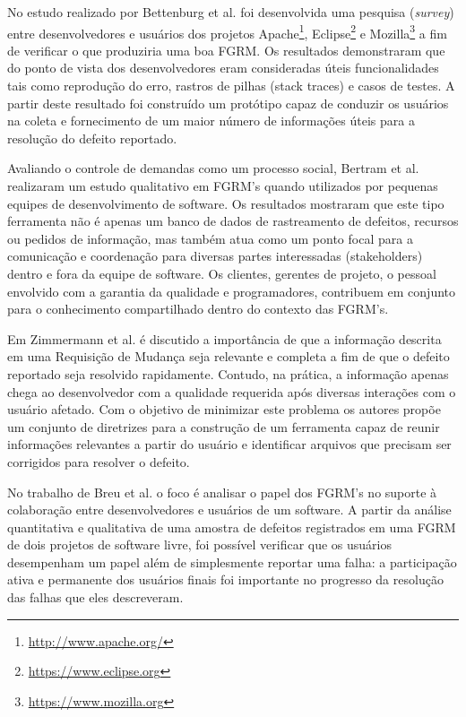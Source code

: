 \documentclass[msc,proposal,hidelot,hideabstract]{ppgccufmg} %
\begin{document}
No estudo realizado por Bettenburg et al. \cite{bettenburg2008makes} foi
desenvolvida uma pesquisa (\textit{survey}) entre desenvolvedores e usuários dos
projetos Apache\footnote{\url{http://www.apache.org/}}, Eclipse\footnote{\url{https://www.eclipse.org}} e Mozilla\footnote{\url{https://www.mozilla.org}} a fim de verificar o que
produziria uma boa FGRM. Os resultados demonstraram que do ponto de vista dos desenvolvedores eram consideradas úteis funcionalidades tais como reprodução do erro, rastros de pilhas (stack traces) e casos de testes. A partir deste resultado foi construído um protótipo capaz de conduzir os usuários na coleta e fornecimento de um maior número de informações úteis para a resolução do defeito reportado.

Avaliando o controle de demandas como um processo social, Bertram et
al. \cite{Bertram:2010:CCB:1718918.1718972} realizaram um estudo qualitativo em
FGRM's quando utilizados por pequenas equipes de desenvolvimento de software. Os resultados mostraram que este tipo ferramenta não é apenas um banco de dados de rastreamento de defeitos, recursos ou pedidos de informação, mas também atua como um ponto focal para a comunicação e coordenação para diversas partes interessadas (stakeholders) dentro e fora da equipe de software. Os
clientes, gerentes de projeto, o pessoal envolvido com a garantia da qualidade
e programadores, contribuem em conjunto para o conhecimento compartilhado dentro do contexto das FGRM's.

Em Zimmermann et al. \cite{5070993} é discutido a importância de que a informação descrita em uma Requisição de Mudança seja relevante e completa a fim de que o defeito reportado seja resolvido rapidamente. Contudo, na prática, a informação apenas chega ao desenvolvedor com a qualidade requerida após diversas interações com o usuário afetado. Com o objetivo de minimizar este
problema os autores propõe um conjunto de diretrizes para a construção de um ferramenta capaz de reunir informações relevantes a partir do usuário e identificar arquivos que precisam ser corrigidos para resolver o defeito.

No trabalho de Breu et al.\cite{Breu:2010:INB:1718918.1718973} o foco é analisar o papel dos FGRM's no suporte à colaboração entre desenvolvedores e usuários de um software. A partir da análise quantitativa e qualitativa de uma amostra de defeitos registrados em uma FGRM de dois projetos de software livre, foi possível verificar que os usuários desempenham um papel além de simplesmente reportar uma falha: a participação ativa e permanente dos usuários finais foi importante no progresso da resolução das falhas que eles descreveram.
\end{document}
